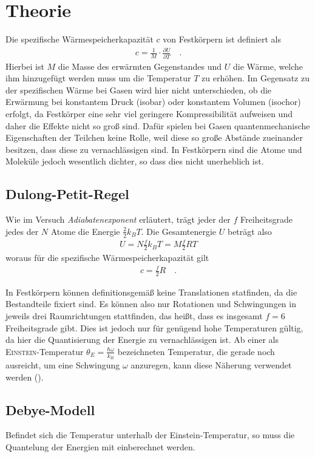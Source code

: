 \documentclass[12pt,a4paper,titlepage,headinclude,bibtotoc]{scrartcl}
\begin{document}
\section{Theorie}
\label{sec:theorie}
Die spezifische Wärmespeicherkapazität $c$ von Festkörpern ist definiert als
\begin{align}
	c=\frac{1}{M}\cdot \frac{\partial U}{\partial T} \quad .
\end{align}
Hierbei ist $M$ die Masse des erwärmten Gegenstandes und $U$ die Wärme, welche ihm hinzugefügt werden muss um  die Temperatur $T$ zu erhöhen.
Im Gegensatz zu der spezifischen Wärme bei Gasen wird hier nicht unterschieden, ob die Erwärmung bei konstantem Druck (isobar) oder konstantem Volumen (isochor) erfolgt, da Festkörper eine sehr viel geringere Kompressibilität aufweisen und daher die Effekte nicht so groß sind.
Dafür spielen bei Gasen quantenmechanische Eigenschaften der Teilchen keine Rolle, weil diese so große Abstände zueinander besitzen, dass diese zu vernachlässigen sind.
In Festkörpern sind die Atome und Moleküle jedoch wesentlich dichter, so dass dies nicht unerheblich ist.

\subsection{Dulong-Petit-Regel}
Wie im Versuch \textit{Adiabatenexponent} erläutert, trägt jeder der $f$ Freiheitsgrade jedes der $N$ Atome die Energie $\frac{2}{2}k_BT$.
Die Gesamtenergie $U$ beträgt also
\begin{align*}
	U=N\frac{f}{2}k_BT=M\frac{f}{2}RT
\end{align*}
woraus für die spezifische Wärmespeicherkapazität gilt
\begin{align}
	c=\frac{f}{2}R \label{eq:f2R}\quad .
\end{align}

In Festkörpern können definitionsgemäß keine Translationen statfinden, da die Bestandteile fixiert sind.
Es können also nur Rotationen und Schwingungen in jeweils drei Raumrichtungen stattfinden, das heißt, dass es insgesamt $f=6$ Freiheitsgrade gibt.
Dies ist jedoch nur für genügend hohe Temperaturen gültig, da hier die Quantisierung der Energie zu vernachlässigen ist.
Ab einer als \textsc{Einstein}-Temperatur $\theta_E=\frac{\hbar \omega}{k_B}$ bezeichneten Temperatur, die gerade noch ausreicht, um eine Schwingung $\omega$ anzuregen, kann diese Näherung verwendet werden (\cite[S. 879]{gerthsen}).

\subsection{Debye-Modell}
Befindet sich die Temperatur unterhalb der Einstein-Temperatur, so muss die Quantelung der Energien mit einberechnet werden.
\end{document}
